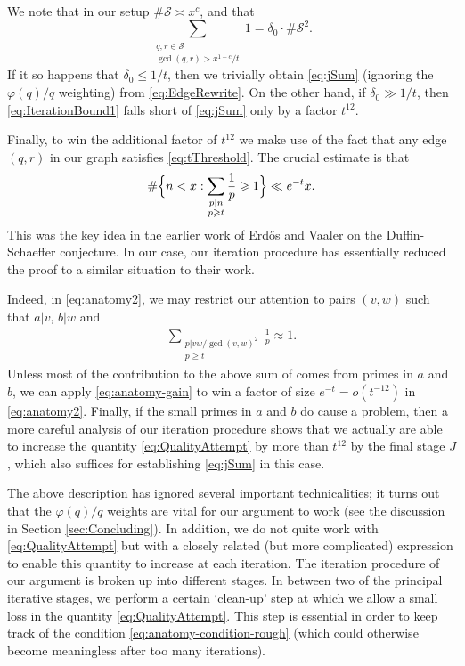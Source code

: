 \documentclass[12pt]{amsart}
\numberwithin{equation}{section}
\theoremstyle{definition}
\theoremstyle{remark}
\newcommand{\CS}{\mathcal{S}}
\newcommand{\eq}[1]{ \begin{equation} \begin{split} #1 \end{split} \end{equation} }
\renewcommand{\phi}{\varphi}
\renewcommand{\le}{\leqslant}
\renewcommand{\ge}{\geqslant}
\begin{document}
We note that in our setup $\#\CS\asymp x^{c}$, and that
\begin{equation}
\sum_{\substack{q,r\in\CS \\ \gcd(q,r)>x^{1-c}/t}}1=\delta_0\cdot \#\CS^2.
\label{eq:EdgeRewrite}
\end{equation}
If it so happens that $\delta_0\le 1/t$, then we trivially obtain \eqref{eq:jSum} (ignoring the $\phi(q)/q$ weighting) from \eqref{eq:EdgeRewrite}. On the other hand, if $\delta_0\gg 1/t $, then \eqref{eq:IterationBound1} falls short of \eqref{eq:jSum} only by a factor $t^{12}$.

Finally, to win the additional factor of $t^{12}$ we make use of the fact that any edge $(q,r)$ in our graph satisfies \eqref{eq:tThreshold}. The crucial estimate is that 
\eq{\label{eq:anatomy-gain}
\#\Bigl\{n<x:\sum_{\substack{p|n\\ p\ge t}}\frac{1}{p}\ge 1\Bigr\}\ll e^{-t} x .
}
This was the key idea in the earlier work of Erd\H os \cite{erdos} and Vaaler \cite{vaaler} on the Duffin-Schaeffer conjecture. In our case, our iteration procedure has essentially reduced the proof to a similar situation to their work. 

Indeed, in \eqref{eq:anatomy2}, we may restrict our attention to pairs $(v,w)$ such that $a|v$, $b|w$ and 
\eq{\label{eq:anatomy-condition-rough}
\sum_{\substack{p|vw/\gcd(v,w)^2 \\ p\ge t}} \frac{1}{p} \approx 1.
}
Unless most of the contribution to the above sum of comes from primes in $a$ and $b$, we can apply \eqref{eq:anatomy-gain} to win a factor of size $e^{-t}=o(t^{-12})$ in \eqref{eq:anatomy2}. Finally, if the small primes in $a$ and $b$ do cause a problem, then a more careful analysis of our iteration procedure shows that we actually are able to increase the quantity \eqref{eq:QualityAttempt} by more than $t^{12}$ by the final stage $J$, which also suffices for establishing \eqref{eq:jSum} in this case.

\medskip

The above description has ignored several important technicalities; it turns out that the $\phi(q)/q$ weights are vital for our argument to work (see the discussion in Section \ref{sec:Concluding}). In addition, we do not quite work with \eqref{eq:QualityAttempt} but with a closely related (but more complicated) expression to enable this quantity to increase at each iteration. The iteration  procedure of our argument is broken up into different stages. In between two of the principal iterative stages, we perform a certain `clean-up' step at which we allow a small loss in the quantity \eqref{eq:QualityAttempt}. This step is essential in order to keep track of the condition \eqref{eq:anatomy-condition-rough} (which could otherwise become meaningless after too many iterations).
\end{document}
